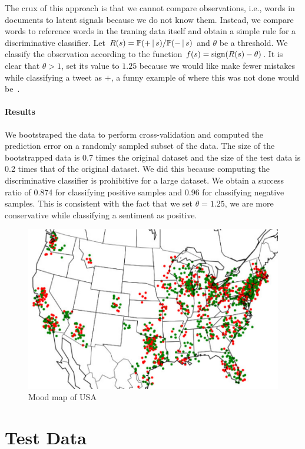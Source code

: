 \documentclass[11pt, letterpaper, conference, final, twocolumn]{ieeeconf}
\begin{document}
The crux of this approach is that we cannot compare observations, i.e., words in documents to latent signals because we do not know them. Instead, we compare words to reference words in the traning data itself and obtain a simple rule for a discriminative classifier. Let $R(s) = \mathbb{P}(+ \, \vert \, s)/\mathbb{P}(- \, \vert \, s)$ and $\theta$ be a threshold. We classify the observation according to the function $f(s) = \textrm{sign}(R(s) - \theta)$. It is clear that $\theta > 1$, set its value to $1.25$ because we would like make fewer mistakes while classifying a tweet as $+$, a funny example of where this was not done would be~\cite{target_pregnant}.

\paragraph{Results}
We bootstraped the data to perform cross-validation and computed the prediction error on a randomly sampled subset of the data. The size of the bootstrapped data is 0.7 times the original dataset and the size of the test data is 0.2 times that of the original dataset. We did this because computing the discriminative classifier is prohibitive for a large dataset. We obtain a success ratio of 0.874 for classifying positive samples and 0.96 for classifying negative samples. This is consistent with the fact that we set $\theta = 1.25$, we are more conservative while classifying a sentiment as positive.


\begin{figure}
\centering
\includegraphics[width=1.5 \columnwidth]{fig/map.pdf}
\caption{Mood map of USA}
\label{fig:map}
\end{figure}

\FloatBarrier
\section{Test Data}
\label{sec:test_data}
\end{document}
